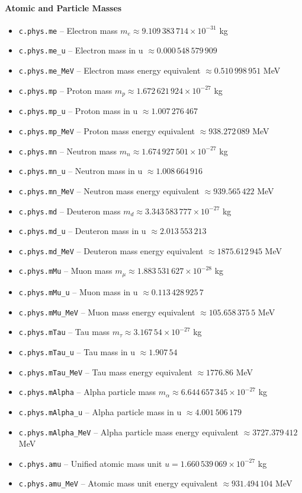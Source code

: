 \paragraph{Atomic and Particle Masses}
\begin{itemize}
\item \texttt{c.phys.me} -- Electron mass $m_e \approx 9.109\,383\,714 \times 10^{-31}$ kg
\item \texttt{c.phys.me\_u} -- Electron mass in u $\approx 0.000\,548\,579\,909$
\item \texttt{c.phys.me\_MeV} -- Electron mass energy equivalent $\approx 0.510\,998\,951$ MeV
\item \texttt{c.phys.mp} -- Proton mass $m_p \approx 1.672\,621\,924 \times 10^{-27}$ kg
\item \texttt{c.phys.mp\_u} -- Proton mass in u $\approx 1.007\,276\,467$
\item \texttt{c.phys.mp\_MeV} -- Proton mass energy equivalent $\approx 938.272\,089$ MeV
\item \texttt{c.phys.mn} -- Neutron mass $m_n \approx 1.674\,927\,501 \times 10^{-27}$ kg
\item \texttt{c.phys.mn\_u} -- Neutron mass in u $\approx 1.008\,664\,916$
\item \texttt{c.phys.mn\_MeV} -- Neutron mass energy equivalent $\approx 939.565\,422$ MeV
\item \texttt{c.phys.md} -- Deuteron mass $m_d \approx 3.343\,583\,777 \times 10^{-27}$ kg
\item \texttt{c.phys.md\_u} -- Deuteron mass in u $\approx 2.013\,553\,213$
\item \texttt{c.phys.md\_MeV} -- Deuteron mass energy equivalent $\approx 1875.612\,945$ MeV
\item \texttt{c.phys.mMu} -- Muon mass $m_\mu \approx 1.883\,531\,627 \times 10^{-28}$ kg
\item \texttt{c.phys.mMu\_u} -- Muon mass in u $\approx 0.113\,428\,925\,7$
\item \texttt{c.phys.mMu\_MeV} -- Muon mass energy equivalent $\approx 105.658\,375\,5$ MeV
\item \texttt{c.phys.mTau} -- Tau mass $m_\tau \approx 3.167\,54 \times 10^{-27}$ kg
\item \texttt{c.phys.mTau\_u} -- Tau mass in u $\approx 1.907\,54$
\item \texttt{c.phys.mTau\_MeV} -- Tau mass energy equivalent $\approx 1776.86$ MeV
\item \texttt{c.phys.mAlpha} -- Alpha particle mass $m_\alpha \approx 6.644\,657\,345 \times 10^{-27}$ kg
\item \texttt{c.phys.mAlpha\_u} -- Alpha particle mass in u $\approx 4.001\,506\,179$
\item \texttt{c.phys.mAlpha\_MeV} -- Alpha particle mass energy equivalent $\approx 3727.379\,412$ MeV
\item \texttt{c.phys.amu} -- Unified atomic mass unit $u = 1.660\,539\,069 \times 10^{-27}$ kg
\item \texttt{c.phys.amu\_MeV} -- Atomic mass unit energy equivalent $\approx 931.494\,104$ MeV
\end{itemize}

